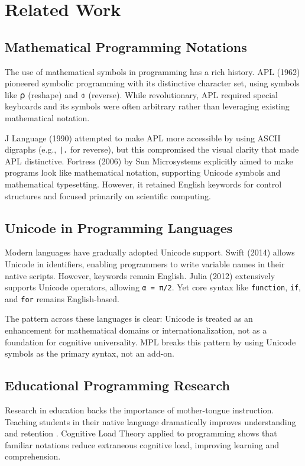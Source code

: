 \documentclass[10pt,conference]{IEEEtran}
\begin{document}
\section{Related Work}

\subsection{Mathematical Programming Notations}

The use of mathematical symbols in programming has a rich history. APL (1962) \cite{iverson1962} pioneered symbolic programming with its distinctive character set, using symbols like ⍴ (reshape) and ⌽ (reverse). While revolutionary, APL required special keyboards and its symbols were often arbitrary rather than leveraging existing mathematical notation.

J Language (1990) attempted to make APL more accessible by using ASCII digraphs (e.g., \texttt{|.} for reverse), but this compromised the visual clarity that made APL distinctive. Fortress (2006) by Sun Microsystems explicitly aimed to make programs look like mathematical notation, supporting Unicode symbols and mathematical typesetting. However, it retained English keywords for control structures and focused primarily on scientific computing.

\subsection{Unicode in Programming Languages}

Modern languages have gradually adopted Unicode support. Swift (2014) allows Unicode in identifiers, enabling programmers to write variable names in their native scripts. However, keywords remain English. Julia (2012) extensively supports Unicode operators, allowing \texttt{α = π/2}. Yet core syntax like \texttt{function}, \texttt{if}, and \texttt{for} remains English-based.

The pattern across these languages is clear: Unicode is treated as an enhancement for mathematical domains or internationalization, not as a foundation for cognitive universality. MPL breaks this pattern by using Unicode symbols as the primary syntax, not an add-on.

\subsection{Educational Programming Research}

Research in education backs the importance of mother-tongue instruction. Teaching students in their native language dramatically improves understanding and retention \cite{begel2007}. Cognitive Load Theory \cite{sweller2011} applied to programming shows that familiar notations reduce extraneous cognitive load, improving learning and comprehension.
\end{document}
